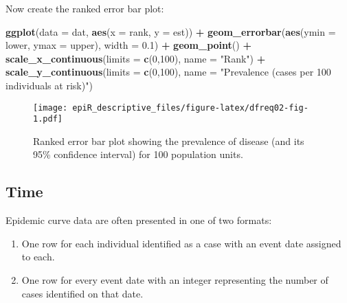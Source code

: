 \documentclass[
]{article}
\newenvironment{Shaded}{\begin{snugshade}}{\end{snugshade}}
\newcommand{\DataTypeTok}[1]{\textcolor[rgb]{0.13,0.29,0.53}{#1}}
\newcommand{\DecValTok}[1]{\textcolor[rgb]{0.00,0.00,0.81}{#1}}
\newcommand{\FloatTok}[1]{\textcolor[rgb]{0.00,0.00,0.81}{#1}}
\newcommand{\KeywordTok}[1]{\textcolor[rgb]{0.13,0.29,0.53}{\textbf{#1}}}
\newcommand{\NormalTok}[1]{#1}
\newcommand{\OperatorTok}[1]{\textcolor[rgb]{0.81,0.36,0.00}{\textbf{#1}}}
\newcommand{\StringTok}[1]{\textcolor[rgb]{0.31,0.60,0.02}{#1}}
\begin{document}
Now create the ranked error bar plot:

\begin{Shaded}
\begin{Highlighting}[]

\KeywordTok{ggplot}\NormalTok{(}\DataTypeTok{data =}\NormalTok{ dat, }\KeywordTok{aes}\NormalTok{(}\DataTypeTok{x =}\NormalTok{ rank, }\DataTypeTok{y =}\NormalTok{ est)) }\OperatorTok{+}
\StringTok{  }\KeywordTok{geom\_errorbar}\NormalTok{(}\KeywordTok{aes}\NormalTok{(}\DataTypeTok{ymin =}\NormalTok{ lower, }\DataTypeTok{ymax =}\NormalTok{ upper), }\DataTypeTok{width =} \FloatTok{0.1}\NormalTok{) }\OperatorTok{+}
\StringTok{  }\KeywordTok{geom\_point}\NormalTok{() }\OperatorTok{+}
\StringTok{  }\KeywordTok{scale\_x\_continuous}\NormalTok{(}\DataTypeTok{limits =} \KeywordTok{c}\NormalTok{(}\DecValTok{0}\NormalTok{,}\DecValTok{100}\NormalTok{), }\DataTypeTok{name =} \StringTok{"Rank"}\NormalTok{) }\OperatorTok{+}
\StringTok{  }\KeywordTok{scale\_y\_continuous}\NormalTok{(}\DataTypeTok{limits =} \KeywordTok{c}\NormalTok{(}\DecValTok{0}\NormalTok{,}\DecValTok{100}\NormalTok{), }\DataTypeTok{name =} \StringTok{"Prevalence (cases per 100 individuals}
\StringTok{     at risk)"}\NormalTok{)}
\end{Highlighting}
\end{Shaded}

\begin{figure}
\centering
\texttt{[image: epiR\_descriptive\_files/figure-latex/dfreq02-fig-1.pdf]}
\caption{\label{fig:dfreq02}Ranked error bar plot showing the prevalence
of disease (and its 95\% confidence interval) for 100 population units.}
\end{figure}

\hypertarget{time}{%
\subsection{Time}\label{time}}

Epidemic curve data are often presented in one of two formats:

\begin{enumerate}
\def\labelenumi{\arabic{enumi}.}
\item
  One row for each individual identified as a case with an event date
  assigned to each.
\item
  One row for every event date with an integer representing the number
  of cases identified on that date.
\end{enumerate}
\end{document}
